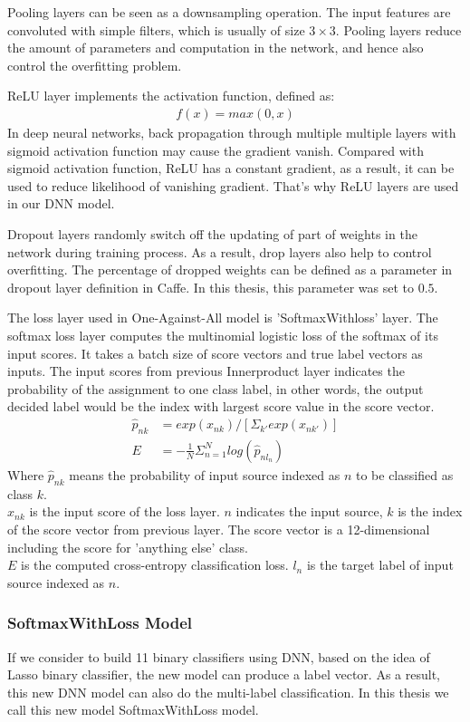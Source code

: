 Pooling layers can be seen as a downsampling operation. The input features are convoluted with simple filters, which is usually of size $3\times3$. Pooling layers reduce the amount of parameters and computation in the network, and hence also control the overfitting problem. 
 
ReLU layer implements the activation function, defined as:
\begin{align}
f(x) = max(0,x)
\end{align}
In deep neural networks, back propagation through multiple  multiple layers with sigmoid activation function may cause the gradient vanish. Compared with sigmoid activation function, ReLU has a constant gradient, as a result, it can be used to reduce likelihood of vanishing gradient. That's why ReLU layers are used in our DNN model.

Dropout layers randomly switch off the updating of part of weights in the network during training process. As a result, drop layers also help to control overfitting.  The percentage of dropped weights can be defined as a parameter in dropout layer definition in Caffe. In this thesis, this parameter was set to $0.5$.

The loss layer used in One-Against-All model is 'SoftmaxWithloss' layer. The softmax loss layer computes the multinomial logistic loss of the softmax of its input scores. It takes a batch size of score vectors and true label vectors as inputs. The input scores from previous Innerproduct layer indicates the probability of the assignment to one class label, in other words, the output decided label would be the index with largest score value in the score vector.
\begin{align}
	\hat{p}_{nk}&=exp(x_{nk})/[\Sigma_{k'}exp(x_{nk'})]\\
	E &= -\frac{1}{N}\Sigma_{n=1}^{N}log(\hat{p}_{nl_n})
\end{align}
Where $\hat{p}_{nk}$ means the probability of input source indexed as $n$ to be classified as class $k$.\\
$x_{nk}$ is the input score of the loss layer. $n$ indicates the input source, $k$ is the index of the score vector from previous layer. The score vector is a 12-dimensional including the score for 'anything else' class.\\
$E$ is the computed cross-entropy classification loss. $l_n$ is the target label of input source indexed as $n$.
\subsubsection{SoftmaxWithLoss Model}
If we consider to build 11 binary classifiers using DNN, based on the idea of Lasso binary classifier, the new model can produce a label vector. As a result, this new DNN model can also do the multi-label classification. In this thesis we call this new model SoftmaxWithLoss model.

